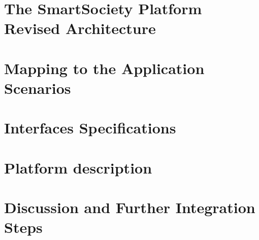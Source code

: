 \documentclass{SmartReport}
\begin{document}
\newpage


\section{The SmartSociety Platform Revised Architecture}
\label{sec:arch}

\newpage

\section{Mapping to the Application Scenarios}
\label{sec:mapping}

\newpage

\section{Interfaces Specifications}
\label{sec:apis}

\newpage


\section{Platform description}
\label{sec:sw}

\newpage

\section{Discussion and Further Integration Steps}
\label{sec:concl}

\newpage



%
\end{document}
